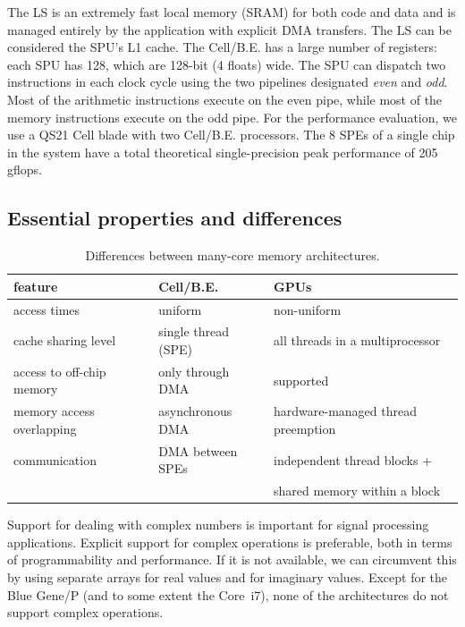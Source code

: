 \documentclass{article}
\begin{document}
The LS is an extremely fast local memory (SRAM) for both code and data
and is managed entirely by the application with explicit DMA
transfers.  The LS can be considered the SPU's L1 cache.  The
\mbox{Cell/B.E.} has a large number of registers: each SPU has 128,
which are 128-bit (4 floats) wide.  The SPU can dispatch two
instructions in each clock cycle using the two pipelines designated
\emph{even} and \emph{odd}. Most of the arithmetic instructions
execute on the even pipe, while most of the memory instructions
execute on the odd pipe.  For the performance evaluation, we use a QS21 Cell blade with two
\mbox{Cell/B.E.} processors.  The 8 SPEs of a single chip in the
system have a total theoretical single-precision peak performance of
205 gflops.




\subsection{Essential properties and differences}

\begin{table}[t]
\begin{center}
{\small
\begin{tabular}{l|l|l}
feature                   & Cell/B.E.                      & GPUs \\
\hline
access times              & uniform                        & non-uniform \\
cache sharing level       & single thread (SPE)            & all threads in a multiprocessor \\
access to off-chip memory & only through DMA               & supported \\
memory access overlapping & asynchronous DMA               & hardware-managed thread preemption \\
communication             & DMA between SPEs               & independent thread blocks + \\
                          &                                & shared memory within a block \\
\end{tabular}
} %
\end{center}
\vspace{-0.5cm}
\caption{Differences between many-core memory architectures.}
\label{memory-properties}
\end{table}

Support for dealing with complex numbers is important for signal
processing applications. Explicit support for complex operations is
preferable, both in terms of programmability and performance.  If it
is not available, we can circumvent this by using separate arrays for
real values and for imaginary values.  Except for the Blue Gene/P (and
to some extent the Core~i7), none of the architectures do not support
complex operations.
\end{document}
